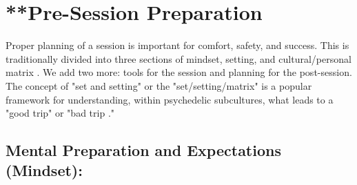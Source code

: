 \documentclass[12pt,letterpaper]{book}
\begin{document}
\section{**Pre-Session Preparation}
\label{prep}
Proper planning of a session is important for comfort, safety, and success. This is traditionally divided into three sections of mindset, setting, and cultural/personal matrix \cite{setSettingMatrix}. We add two more: tools for the session and planning for the post-session. The concept of "set and setting" or the "set/setting/matrix" is a popular framework for understanding, within psychedelic subcultures, what leads to a "good trip" or "bad trip \cite{setSettingMatrix}."

\subsection*{Mental Preparation and Expectations (Mindset):}
\end{document}
